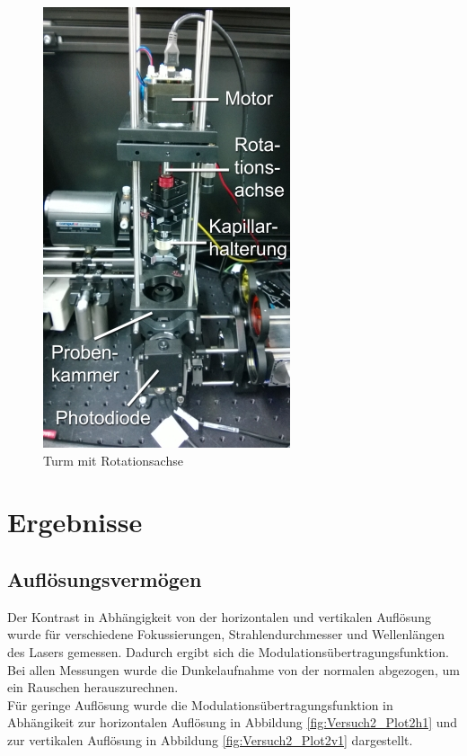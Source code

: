 \begin{minipage}{\linewidth}
\begin{figure}[H]
	\centering
\includegraphics[width=0.491\linewidth]{IMAGE/turm.png}
	\caption{Turm mit Rotationsachse \cite{Anleitung}}
	\label{fig:turm}
\end{figure}

\section{Ergebnisse}
\subsection{Auflösungsvermögen}
Der Kontrast in Abhängigkeit von der horizontalen und vertikalen Auflösung wurde für verschiedene Fokussierungen, Strahlendurchmesser und Wellenlängen des Lasers gemessen. Dadurch ergibt sich die Modulationsübertragungsfunktion.\\ 
Bei allen Messungen wurde die Dunkelaufnahme von der normalen abgezogen, um ein Rauschen herauszurechnen.\\
Für geringe Auflösung wurde die Modulationsübertragungsfunktion  in Abhängikeit zur horizontalen Auflösung in Abbildung \ref{fig:Versuch2_Plot2h1} und zur vertikalen Auflösung in Abbildung \ref{fig:Versuch2_Plot2v1} dargestellt.\\
\end{minipage}

